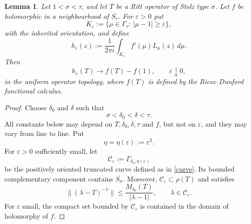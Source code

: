 \documentclass[11pt]{amsart}
\numberwithin{equation}{section}
\newtheorem{lemma}[theorem]{Lemma}
\theoremstyle{definition}
\theoremstyle{plain}
\begin{document}
\begin{lemma}\label{lem:rational-truncation-compatibility}
Let $1<\sigma<\tau$, and let $T$ be a Ritt operator of Stolz type
$\sigma$.  Let $f$ be holomorphic in a neighbourhood of $\overline{S_\tau}$.
For $\varepsilon>0$ put
\[
        K_\varepsilon
        :=
        \{\mu\in\Gamma_\tau:\ |\mu-1|\ge\varepsilon\},
\]
with the inherited orientation, and define
\[
        h_\varepsilon(z)
        :=
        \frac1{2\pi i}
        \int_{K_\varepsilon}f'(\mu)L_\mu(z)\,d\mu .
\]
Then
\[
        h_\varepsilon(T)\longrightarrow f(T)-f(1),
        \qquad \varepsilon\downarrow0,
\]
in the uniform operator topology, where $f(T)$ is defined by the Riesz--Dunford functional calculus.
\end{lemma}
\begin{proof}
Choose \(\delta_0\) and \(\delta\) such that
\[
        \sigma<\delta_0<\delta<\tau .
\]
All constants below may depend on \(T,\delta_0,\delta,\tau\) and \(f\), but
not on \(\varepsilon\), and they may vary from line to line.  Put
\begin{equation}\label{eta}
        \eta=\eta(\varepsilon):=\varepsilon^2 .
\end{equation}
For \(\varepsilon>0\) sufficiently small, let
\begin{equation}\label{gammacur}
        \mathcal C_\varepsilon:=\Gamma_{\delta_0,\eta(\varepsilon)}
\end{equation}
be the positively oriented truncated curve defined as in \eqref{curve}.
Its bounded complementary component contains
\(\overline{S_\sigma}\). Moreover, 
\(\mathcal C_\varepsilon \subset \rho(T)\) and satisfies
\[
        \|(\lambda-T)^{-1}\|
        \le
        \frac{M_{\delta_0}(T)}{|\lambda-1|},
        \qquad \lambda\in\mathcal C_\varepsilon.
\]
For \(\varepsilon\) small, the compact set bounded by
\(\mathcal C_\varepsilon\) is contained in the domain of holomorphy of \(f\).




\end{proof}
\end{document}

